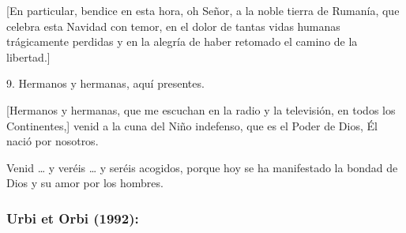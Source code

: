 \begin{body}
	{[}En particular, bendice en esta hora, oh Señor, a la noble tierra de Rumanía, que celebra esta Navidad con temor, en el dolor de tantas vidas humanas trágicamente perdidas y en la alegría de haber retomado el camino de la libertad.{]}
	
	9. Hermanos y hermanas, aquí presentes.
	
	{[}Hermanos y hermanas, que me escuchan en la radio y la televisión, en todos los Continentes,{]} venid a la cuna del Niño indefenso, que es el Poder de Dios, Él nació por nosotros.
	
	Venid \ldots{} y veréis \ldots{} y seréis acogidos, porque hoy se ha manifestado la bondad de Dios y su amor por los hombres.
\end{body}


\subsubsection{Urbi et Orbi (1992):}

